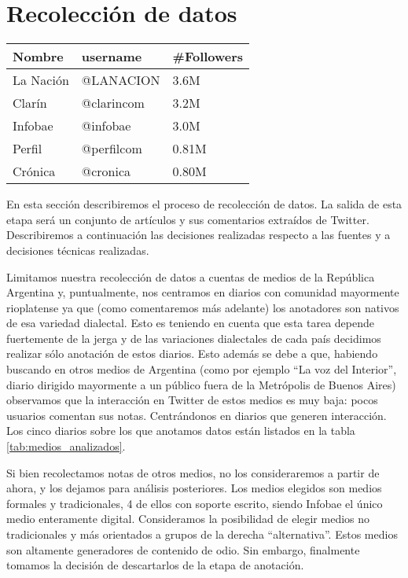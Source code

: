 

\section{Recolección de datos}

\begin{table*}[t]
    \centering
    \large
    \begin{tabular}{ lll }
        Nombre     &  username          & \#Followers \\
        \hline
        La Nación  &  @LANACION         & 3.6M            \\
        Clarín     &  @clarincom        & 3.2M        \\
        Infobae    &  @infobae          & 3.0M   \\
        Perfil     &  @perfilcom        & 0.81M    \\
        Crónica    &  @cronica          & 0.80M     \\
        \hline
    \end{tabular}
    \caption{Cuentas de medios utilizadas para la recolección de datos.}
    \label{tab:medios_analizados}
\end{table*}


En esta sección describiremos el proceso de recolección de datos. La salida de esta etapa será un conjunto de artículos y sus comentarios extraídos de Twitter. Describiremos a continuación las decisiones realizadas respecto a las fuentes y a decisiones técnicas realizadas.

Limitamos nuestra recolección de datos a cuentas de medios de la República Argentina y, puntualmente, nos centramos en diarios con comunidad mayormente rioplatense ya que (como comentaremos más adelante) los anotadores son nativos de esa variedad dialectal. Esto es teniendo en cuenta que esta tarea depende fuertemente de la jerga y de las variaciones dialectales de cada país decidimos realizar sólo anotación de estos diarios. Esto además se debe a que, habiendo buscando en otros medios de Argentina (como por ejemplo ``La voz del Interior'', diario dirigido mayormente a un público fuera de la Metrópolis de Buenos Aires) observamos que la interacción en Twitter de estos medios es muy baja: pocos usuarios comentan sus notas.  Centrándonos en diarios que generen interacción. Los cinco diarios sobre los que anotamos datos están listados en la tabla \ref{tab:medios_analizados}.

Si bien recolectamos notas de otros medios, no los consideraremos a partir de ahora, y los dejamos para análisis posteriores. Los medios elegidos son medios formales y tradicionales, 4 de ellos con soporte escrito, siendo Infobae el único medio enteramente digital. Consideramos la posibilidad de elegir medios no tradicionales y más orientados a grupos de la derecha ``alternativa''. Estos medios son altamente generadores de contenido de odio. Sin embargo, finalmente tomamos la decisión de descartarlos de la etapa de anotación.



